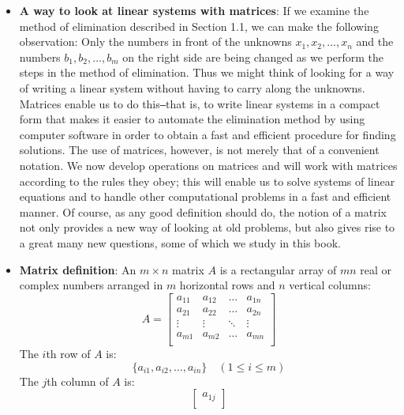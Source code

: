 \documentclass{report}
\begin{document}
\begin{itemize}
         \item \textbf{A way to look at linear systems with matrices}:
             If we examine the method of elimination described in Section 1.1, we can make the 
             following observation: Only the numbers in front of the unknowns $x_1, x_2, \ldots, x_n$ 
             and the numbers $b_1, b_2, \ldots, b_m$ on the right side are being changed as we perform 
             the steps in the method of elimination. Thus we might think of looking for a way 
             of writing a linear system without having to carry along the unknowns. Matrices 
             enable us to do this\texttt{--}that is, to write linear systems in a compact form that makes 
             it easier to automate the elimination method by using computer software in order 
             to obtain a fast and efficient procedure for finding solutions. The use of matrices, 
             however, is not merely that of a convenient notation. We now develop operations 
             on matrices and will work with matrices according to the rules they obey; this will 
             enable us to solve systems of linear equations and to handle other computational 
             problems in a fast and efficient manner. Of course, as any good definition should 
             do, the notion of a matrix not only provides a new way of looking at old problems, 
             but also gives rise to a great many new questions, some of which we study in this 
             book.
         \item \textbf{Matrix definition}:
             An $m \times n$ matrix $A$ is a rectangular array of $mn$ real or complex numbers arranged in $m$ horizontal rows and $n$ vertical columns:
             \[
                 A = \begin{bmatrix}
                     a_{11} & a_{12} & \dots & a_{1n} \\
                     a_{21} & a_{22} & \dots & a_{2n} \\
                     \vdots & \vdots & \ddots & \vdots \\
                     a_{m1} & a_{m2} & \dots & a_{mn} \\
                 \end{bmatrix}
             \]
             The $i$th row of $A$ is:
             \[
                 \{a_{i1}, a_{i2}, \dots, a_{in}\} \quad (1 \leq i \leq m)
             \]
             The $j$th column of $A$ is:
             \[
                 \begin{bmatrix}
                     a_{1j} \\

\end{bmatrix}\]
\end{itemize}
\end{document}
